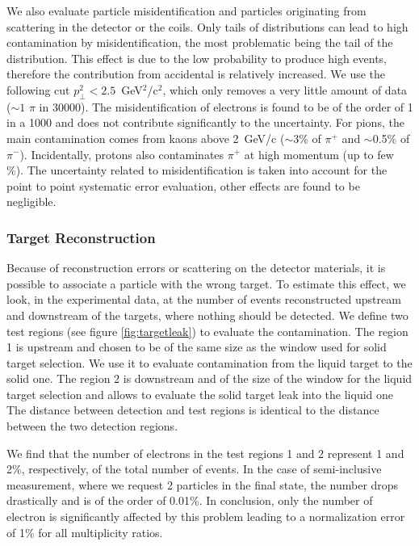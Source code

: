 We also evaluate particle misidentification and particles originating from 
scattering in the detector or the coils. Only tails of distributions can lead to high 
contamination by misidentification, the most problematic being the tail of the 
\pt distribution. This effect is due to the low probability to produce high 
\pt events, therefore the contribution from accidental is relatively 
increased. We use the following cut $p_\perp^2 < 2.5$~GeV$^2$/c$^2$, which 
only removes a very little amount of data ($\sim 1$ $\pi$ in 30000). The 
misidentification of electrons is found to be of the order of 1 in a 1000 and 
does not contribute significantly to the uncertainty. For pions, the main 
contamination comes from kaons above 2~GeV/c ($\sim$3\% of $\pi^+$ and 
$\sim$0.5\% of $\pi^-$). Incidentally, protons also contaminates $\pi^+$ at 
high momentum (up to few \%). The uncertainty related to 
misidentification is taken into account for the point to point systematic error 
evaluation, other effects are found to be negligible.

\subsubsection{Target Reconstruction}

Because of reconstruction errors or scattering on the detector materials, it 
is possible to associate a particle with the wrong target. To estimate this 
effect, we look, in the experimental data, at the number of events 
reconstructed upstream and downstream of the targets, where nothing should be
detected. We define two test regions (see figure \ref{fig:targetleak}) to evaluate
the contamination. The region 1 is upstream and chosen to be of the same size as the window used for solid 
target selection. We use it to evaluate contamination from the liquid target to the solid one. The region 2
is downstream and of the size of the window for the liquid target selection and allows to evaluate the solid target leak into the liquid one
The distance between detection and test regions is identical to the 
distance between the two detection regions. 

We find
that the number of electrons in the test regions 1 and 2 represent 1 and 2\%, 
respectively, of the total number of events. In the case of semi-inclusive measurement, where we request
2 particles in the final state, the number drops drastically and is of the order of
0.01\%. In conclusion, only the number of electron is significantly affected by this problem
leading to a normalization error of 1\% for all multiplicity ratios.

